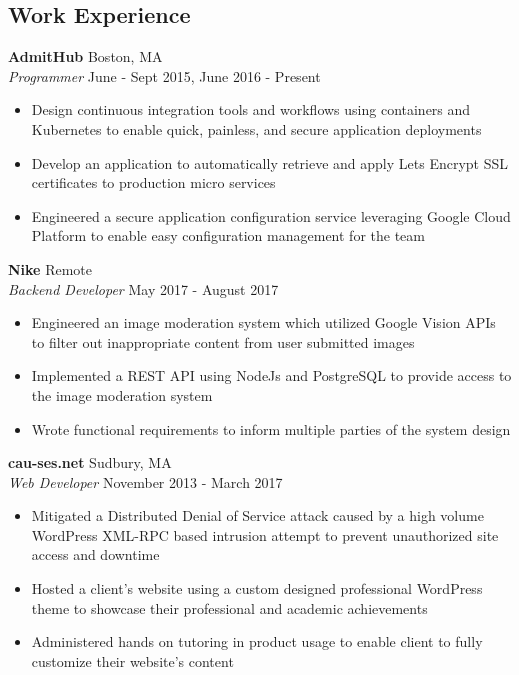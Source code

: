 \documentclass[10pt]{article}
\begin{document}
\begin{flushleft}
\section{Work Experience}
	\textbf{AdmitHub} \hfill Boston, MA \\
	\textit{Programmer} \hfill June - Sept 2015, June 2016 - Present \\
	\begin{itemize}
		\item Design continuous integration tools and workflows using 
		      containers and Kubernetes to enable quick, painless, and 
		      secure application deployments
		\item Develop an application to automatically retrieve and apply 
		      Lets Encrypt SSL certificates to production micro services
		\item Engineered a secure application configuration service 
		      leveraging Google Cloud Platform to enable easy 
		      configuration management for the team
	\end{itemize}

	\vspace{1em}
	\textbf{Nike} \hfill Remote \\
	\textit{Backend Developer} \hfill May 2017 - August 2017 \\
	\begin{itemize}
		\item Engineered an image moderation system which utilized 
		      Google Vision APIs to filter out inappropriate content 
		      from user submitted images
		\item Implemented a REST API using NodeJs and PostgreSQL to 
		      provide access to the image moderation system
		\item Wrote functional requirements to inform multiple parties  
		      of the system design
	\end{itemize}

	\vspace{1em}
	\textbf{cau-ses.net} \hfill Sudbury, MA \\
	\textit{Web Developer} \hfill November 2013 - March 2017 \\
	\begin{itemize}
		\item Mitigated a Distributed Denial of Service attack caused  
		      by a high volume WordPress XML-RPC based intrusion 
		      attempt to prevent unauthorized site access and 
		      downtime
		\item Hosted a client's website using a custom designed 
		      professional WordPress theme to showcase their
		      professional and academic achievements
		\item Administered hands on tutoring in product usage to enable
		      client to fully customize their website's content
	\end{itemize}


\end{flushleft}
\end{document}
